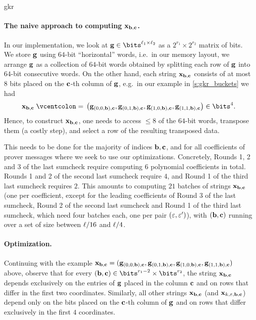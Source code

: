 \begin{lncsappendix}{gkr}

\paragraph{The naive approach to computing $\mathbf{x}_{\mathbf{b},\mathbf{c}}$.}  In our implementation, we look at $\bfg\in \bits^{\codedim_1\times \codedim_2}$ as a $2^{r_1}\times 2^{r_2}$ matrix of bits.  We store $\mathbf{g}$ using $64$-bit ``horizontal'' words, i.e.\ in our memory layout, we arrange $\mathbf{g}$ as a collection of $64$-bit words obtained by splitting each row of $\mathbf{g}$ into $64$-bit consecutive words.  On the other hand, each string $\mathbf{x}_{\mathbf{b},\mathbf{c}}$ consists of at most $8$ bits placed on the $\mathbf{c}$-th column of $\mathbf{g}$, e.g.\ in our example in \cref{s:gkr_buckets} we had $$\xx_{\bb,\cc}\defeq \left(\bfg_{(0,0,\bb),\cc},\bfg_{(0,1,\bb),\cc},\bfg_{(1,0,\bb),\cc},\bfg_{(1,1,\bb),\cc}\right)\in \bits^4.$$ Hence, to construct $\mathbf{x}_{\mathbf{b},\mathbf{c}}$, one needs to access $\leq 8$ of the $64$-bit words, transpose them (a costly step), and select a row of the resulting transposed data.  

This needs to be done for the majority of indices  $\mathbf{b},\mathbf{c}$, and for all coefficients of prover messages where we seek to use our optimizations. Concretely,  Rounds 1, 2 and 3 of the last sumcheck require computing $6$ polynomial coefficients in total. Rounds 1 and 2 of the second last sumcheck require  $4$, and Round 1 of the third last sumcheck requires $2$. This amounts to computing $21$ batches of strings $\mathbf{x}_{\mathbf{b},\mathbf{c}}$ (one per coefficient, except for the leading coefficients of Round 3 of the last sumcheck, Round 2 of the second last sumcheck and Round 1 of the third last sumcheck, which need four batches each, one per pair $(\varepsilon,\varepsilon')$), with $(\mathbf{b},\mathbf{c})$ running over a set of size between $\ell/16$ and $\ell/4$. 


\paragraph{Optimization.} Continuing with the example $\mathbf{x}_{\mathbf{b},\mathbf{c}}=(\mathbf{g}_{(0,0,\mathbf{b}),\mathbf{c}},\mathbf{g}_{(0,1,\mathbf{b}),\mathbf{c}},\mathbf{g}_{(1,0,\mathbf{b}),\mathbf{c}},\mathbf{g}_{(1,1,\mathbf{b}),\mathbf{c}})$ above, observe that  for  every $(\bb,\cc)\in\bits^{r_1-2}\times \bits^{r_2}$, the string $\mathbf{x}_{\mathbf{b},\mathbf{c}}$ depends exclusively on the entries of $\mathbf{g}$ placed in the column $\mathbf{c}$ and on rows that differ  in the first two coordinates. Similarly, all other strings  $\mathbf{x}_{\mathbf{b},\mathbf{c}}$ (and $\mathbf{x}_{k,\varepsilon,\mathbf{b},\mathbf{c}}$)   depend only on the bits placed on the $\mathbf{c}$-th column of $\mathbf{g}$ and on rows that differ exclusively in the first $4$ coordinates.




\end{lncsappendix}
